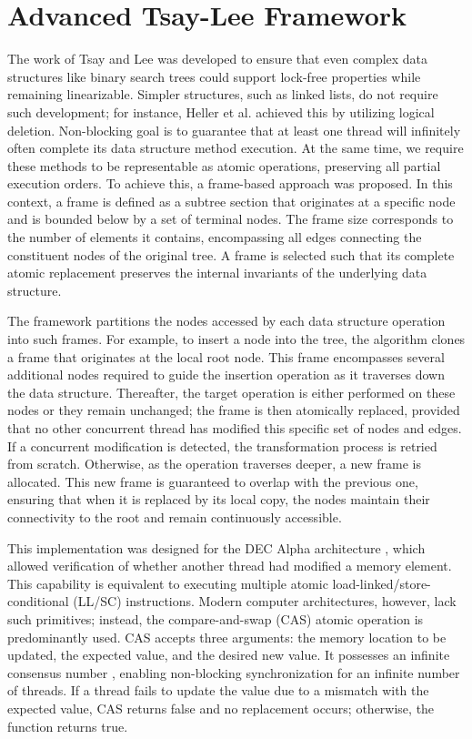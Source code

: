 \section{Advanced Tsay-Lee Framework}
\label{sec:advanced_tsay_lee_framework}

The work of Tsay and Lee \cite{TsayLee} was developed to ensure that even complex data structures like binary search trees could support lock-free properties while remaining linearizable. Simpler structures, such as linked lists, do not require such development; for instance, Heller et al. \cite{LockFreeList} achieved this by utilizing logical deletion. Non-blocking goal is to guarantee that at least one thread will infinitely often complete its data structure method execution. At the same time, we require these methods to be representable as atomic operations, preserving all partial execution orders. To achieve this, a frame-based approach was proposed. In this context, a frame is defined as a subtree section that originates at a specific node and is bounded below by a set of terminal nodes. The frame size corresponds to the number of elements it contains, encompassing all edges connecting the constituent nodes of the original tree. A frame is selected such that its complete atomic replacement preserves the internal invariants of the underlying data structure.



The framework partitions the nodes accessed by each data structure operation into such frames. For example, to insert a node into the tree, the algorithm clones a frame that originates at the local root node. This frame encompasses several additional nodes required to guide the insertion operation as it traverses down the data structure. Thereafter, the target operation is either performed on these nodes or they remain unchanged; the frame is then atomically replaced, provided that no other concurrent thread has modified this specific set of nodes and edges. If a concurrent modification is detected, the transformation process is retried from scratch. Otherwise, as the operation traverses deeper, a new frame is allocated. This new frame is guaranteed to overlap with the previous one, ensuring that when it is replaced by its local copy, the nodes maintain their connectivity to the root and remain continuously accessible.

This implementation was designed for the DEC Alpha architecture \cite{SitesDECAlpha}, which allowed verification of whether another thread had modified a memory element. This capability is equivalent to executing multiple atomic load-linked/store-conditional (LL/SC) instructions. Modern computer architectures, however, lack such primitives; instead, the compare-and-swap (CAS) atomic operation is predominantly used. CAS accepts three arguments: the memory location to be updated, the expected value, and the desired new value. It possesses an infinite consensus number \cite{WaitFreeSync}, enabling non-blocking synchronization for an infinite number of threads. If a thread fails to update the value due to a mismatch with the expected value, CAS returns false and no replacement occurs; otherwise, the function returns true.

